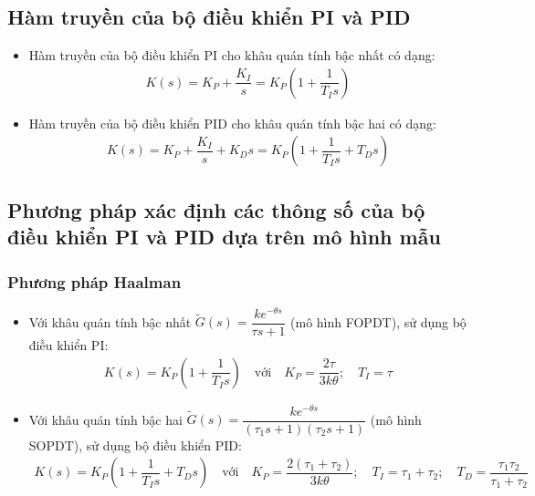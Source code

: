 \subsection{Hàm truyền của bộ điều khiển PI và PID}
    \begin{itemize}
        \item Hàm truyền của bộ điều khiển PI cho khâu quán tính bậc nhất có dạng:
            \begin{align*}
                K(s) = K_P + \dfrac{K_I}{s} = K_P \left({1 + \dfrac{1}{T_I s}}\right)
            \end{align*}

        \item Hàm truyền của bộ điều khiển PID cho khâu quán tính bậc hai có dạng:
            \begin{align*}
                K(s) = K_P + \dfrac{K_I}{s} + K_D s = K_P \left({1 + \dfrac{1}{T_I s} + T_D s}\right)
            \end{align*}
    \end{itemize}

\subsection{Phương pháp xác định các thông số của bộ điều khiển PI và PID dựa trên mô hình mẫu}
\subsubsection{Phương pháp Haalman}
    \begin{itemize}
        \item Với khâu quán tính bậc nhất $\tilde{G}(s) = \dfrac{k e^{-\theta s}}{\tau s + 1}$ (mô hình FOPDT), sử dụng bộ điều khiển PI:
            \begin{align*}
                K(s) = K_P \left({1 + \dfrac{1}{T_I s}}\right) \quad \textrm{với} \quad K_P = \dfrac{2 \tau}{3 k \theta}; \quad T_I = \tau
            \end{align*}

        \item Với khâu quán tính bậc hai $\tilde{G}(s) = \dfrac{k e^{-\theta s}}{\left({\tau_1 s + 1}\right) \left({\tau_2 s + 1}\right)}$ (mô hình SOPDT), sử dụng bộ điều khiển PID:
            \begin{align*}
                K(s) = K_P \left({1 + \dfrac{1}{T_I s} + T_D s}\right) \quad \textrm{với} \quad K_P = \dfrac{2 \left({\tau_1 + \tau_2}\right)}{3 k \theta}; \quad T_I = \tau_1 + \tau_2; \quad T_D = \dfrac{\tau_1 \tau_2}{\tau_1 + \tau_2}
            \end{align*}
    \end{itemize}

